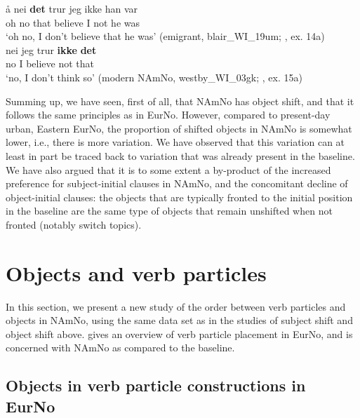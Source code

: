 \documentclass[output=paper]{langscibook}
\begin{document}
\ea\label{ex:larsson:25}
\ea 
\gll å   {nei} \textbf{{det}} {trur}   {jeg}   {ikke}   {han}   {var}\\
	oh   no that believe I   not   he   was\\
\glt ‘oh no, I don’t believe that he was’ (emigrant, blair\_WI\_19um; \citealt{LarssonForthcoming}, ex. 14a)\label{ex:larsson:25a}\\
\ex 
\gll nei jeg trur \textbf{ikke} \textbf{det}\\
     no I believe not that\\
\glt ‘no, I don’t think so’ (modern NAmNo, westby\_WI\_03gk; \citealt{LarssonForthcoming}, ex. 15a)\label{ex:larsson:25bs}\\
\z
\z

Summing up, we have seen, first of all, that NAmNo has object shift, and that it follows the same principles as in EurNo. However, compared to present-day urban, Eastern EurNo, the proportion of shifted objects in NAmNo is somewhat lower, i.e., there is more variation. We have observed that this variation can at least in part be traced back to variation that was already present in the baseline. We have also argued that it is to some extent a by-product of the increased preference for subject-initial clauses in NAmNo, and the concomitant decline of object-initial clauses: the objects that are typically fronted to the initial position in the baseline are the same type of objects that remain unshifted when not fronted (notably switch topics).

\section{Objects and verb particles}\label{sec:larsson:5}

In this section, we present a new study of the order between verb particles and objects in NAmNo, using the same data set as in the studies of subject shift and object shift above.  gives an overview of verb particle placement in EurNo, and  is concerned with NAmNo as compared to the baseline. 

\subsection{Objects in verb particle constructions in EurNo}\label{sec:larsson:5.1}
\end{document}
